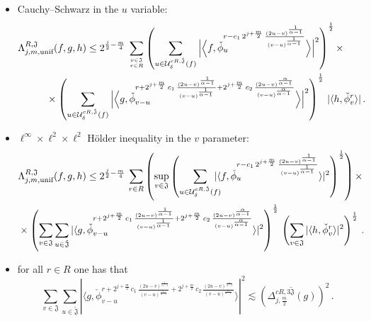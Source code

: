 \documentclass[a4paper,reqno]{amsart}
\numberwithin{equation}{section}
\theoremstyle{definition}
\def\beq{\begin{equation}}
\def\eeq{\end{equation}}
\def\beq{\begin{equation}}
\def\eeq{\end{equation}}
\def\a{\alpha}
\def\beq{\begin{equation}}
\def\eeq{\end{equation}}
\def\beq{\begin{equation}}
\def\eeq{\end{equation}}
\def\d{\delta}
\def\L{\Lambda}
\begin{document}
\begin{itemize}
\item Cauchy--Schwarz in the $u$ variable:
\begin{align}
	&\L_{j,m,\text{unif}}^{R,\mathfrak{J}}(f,g,h)\le 2^{\frac{j}{2}-\frac{m}{4}}\,\sum_{{v\in \mathfrak{J}}\atop{r\in R}} \left(\sum_{u\in \mathcal{U}_{\d}^{cR,\tilde{\mathfrak{J}}}(f)}  \Big|\Big\langle f,  \check{\phi}_{u}^{r- c_1\,2^{j+\frac{m}{2}}\,\frac{(2u-v)^{\frac{1}{\a-1}}}{(v-u)^{\frac{1}{\a-1}}}}\Big\rangle\Big|^2\right)^{\frac{1}{2}}\times\nonumber\\
	&\hspace{1cm}\times\left(\sum_{u\in \mathcal{U}_{\d}^{cR,\tilde{\mathfrak{J}}}(f)} \Big|\Big\langle g,  \check{\phi}_{v-u}^{r+2^{j+\frac{m}{2}}\,c_1\,\frac{(2u-v)^{\frac{1}{\a-1}}}{(v-u)^{\frac{1}{\a-1}}}+
		2^{j+\frac{m}{2}}\,c_2\,\frac{(2u-v)^{\frac{\a}{\a-1}}}{(v-u)^{\frac{\a}{\a-1}}}}\Big\rangle\Big|^2\right)^{\frac{1}{2}}\, |\langle h,  \check{\phi}_{v}^{r}\rangle|\,.\label{ljmunif1}
\end{align}

 \item $\ell^{\infty}\times \ell^2\times \ell^2$ H\"older inequality in the $v$ parameter:
\begin{align}
&\L_{j,m,\text{unif}}^{R,\mathfrak{J}}(f,g,h)\leq 2^{\frac{j}{2}-\frac{m}{4}}\,\sum_{r\in R} \left(\sup_{v\in \mathfrak{J}}\left(\sum_{u\in \mathcal{U}_{\d}^{cR,\tilde{\mathfrak{J}}}(f)}\hspace{-.3cm}  |\langle f,  \check{\phi}_{u}^{r- c_1\,2^{j+\frac{m}{2}}\,\frac{(2u-v)^{\frac{1}{\a-1}}}{(v-u)^{\frac{1}{\a-1}}}}\rangle|^2\right)^{\frac{1}{2}}\right)\times\nonumber\\
&\times\left(\sum_{v\in \mathfrak{J}}\sum_{u\in \tilde{\mathfrak{J}}} |\langle g,  \check{\phi}_{v-u}^{r+2^{j+\frac{m}{2}}\,c_1\,\frac{(2u-v)^{\frac{1}{\a-1}}}{(v-u)^{\frac{1}{\a-1}}}+
	2^{j+\frac{m}{2}}\,c_2\,\frac{(2u-v)^{\frac{\a}{\a-1}}}{(v-u)^{\frac{\a}{\a-1}}}}\rangle|^2\right)^{\frac{1}{2}}\, \left(\sum_{v\in \mathfrak{J}}|\langle h,  \check{\phi}_{v}^{r}\rangle|^2\right)^{\frac{1}{2}}\,.\label{ljmunif2}
\end{align}

\item for all $r\in R$ one has that
\beq\label{ljmunifg}
\sum_{v\in \mathfrak{J}}\sum_{u\in \tilde{\mathfrak{J}}} |\langle g,  \check{\phi}_{v-u}^{r+2^{j+\frac{m}{2}}\,c_1\,\frac{(2u-v)^{\frac{1}{\a-1}}}{(v-u)^{\frac{1}{\a-1}}}+
2^{j+\frac{m}{2}}\,c_2\,\frac{(2u-v)^{\frac{\a}{\a-1}}}{(v-u)^{\frac{\a}{\a-1}}}}\rangle|^2\lesssim \left(\Delta_{j,\frac{m}{2}}^{c R, 3\tilde{\mathfrak{J}}}(g)\right)^2\,.
\eeq
\end{itemize}
\end{document}
